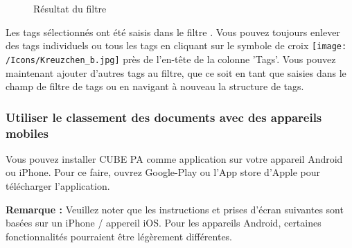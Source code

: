 \begin{figure}[H]
\caption{Résultat du filtre}
\end{figure}

Les tags sélectionnés ont été saisis dans le filtre . Vous pouvez toujours enlever des tags individuels ou tous les tags en cliquant sur le symbole de croix \texttt{[image: /Icons/Kreuzchen\_b.jpg]} près de l'en-tête de la colonne 'Tags'. Vous pouvez maintenant ajouter d'autres tags au filtre, que ce soit en tant que saisies dans le champ de filtre de tags ou en navigant à nouveau la structure de tags.  

\vspace{\baselineskip}

\subsubsection{Utiliser le classement des documents avec des appareils mobiles}

Vous pouvez installer CUBE PA comme application sur votre appareil Android ou iPhone. Pour ce faire, ouvrez Google-Play ou l'App store d'Apple pour télécharger l'application.

\vspace{\baselineskip}

\textbf{Remarque :} Veuillez noter que les instructions et prises d'écran suivantes sont basées sur un iPhone / appereil iOS. Pour les appareils Android, certaines fonctionnalités pourraient être légèrement différentes.

\vspace{\baselineskip}

